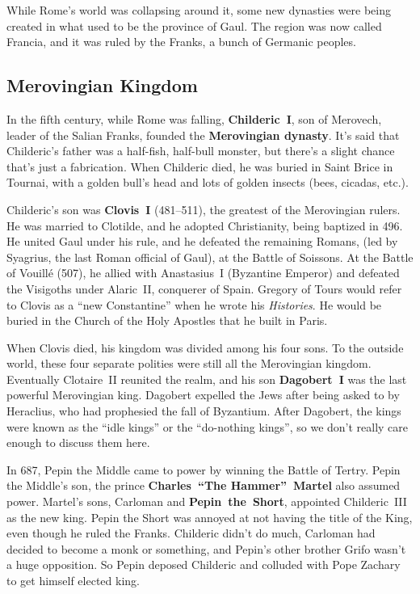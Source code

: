 While Rome's world was collapsing around it,
some new dynasties were being created in what used to be the province of Gaul.
The region was now called Francia, and it was ruled by the Franks, a bunch of Germanic peoples.

\subsection*{Merovingian Kingdom}

In the fifth century, while Rome was falling,
\textbf{Childeric~I}, son of Merovech, leader of the Salian Franks, founded the \textbf{Merovingian dynasty}.
It's said that Childeric's father was a half-fish, half-bull monster,
but there's a slight chance that's just a fabrication.
When Childeric died, he was buried in Saint Brice in Tournai,
with a golden bull's head and lots of golden insects (bees, cicadas, etc.).

Childeric's son was \textbf{Clovis~I} (481--511), the greatest of the Merovingian rulers.
He was married to Clotilde, and he adopted Christianity, being baptized in 496.
He united Gaul under his rule, and he defeated the remaining Romans,
(led by Syagrius, the last Roman official of Gaul), at the Battle of Soissons.
At the Battle of Vouill\'e (507), he allied with Anastasius~I (Byzantine Emperor)
and defeated the Visigoths under Alaric~II, conquerer of Spain.
Gregory of Tours would refer to Clovis as a ``new Constantine'' when he wrote his \textit{Histories}.
He would be buried in the Church of the Holy Apostles that he built in Paris.

When Clovis died, his kingdom was divided among his four sons.
To the outside world, these four separate polities were still all the Merovingian kingdom.
Eventually Clotaire~II reunited the realm, and his son \textbf{Dagobert~I} was the last powerful Merovingian king.
Dagobert expelled the Jews after being asked to by Heraclius, who had prophesied the fall of Byzantium.
After Dagobert, the kings were known as the ``idle kings'' or the ``do-nothing kings'',
so we don't really care enough to discuss them here.

In 687, Pepin the Middle came to power by winning the Battle of Tertry.
Pepin the Middle's son, the prince \textbf{Charles~``The Hammer''~Martel} also assumed power.
Martel's sons, Carloman and \textbf{Pepin~the~Short}, appointed Childeric~III as the new king.
Pepin the Short was annoyed at not having the title of the King, even though he ruled the Franks.
Childeric didn't do much, Carloman had decided to become a monk or something,
and Pepin's other brother Grifo wasn't a huge opposition.
So Pepin deposed Childeric and colluded with Pope Zachary to get himself elected king.

